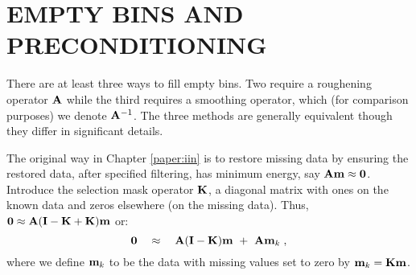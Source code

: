 %
%



\section{EMPTY BINS AND PRECONDITIONING}
There are at least three ways to fill empty bins.
Two require a roughening operator $\bold A$ while
the third requires a smoothing operator, which
(for comparison purposes) we denote $\bold A^{-1}$.
The three methods are generally equivalent
though they differ in significant details.

\par
The original way in
Chapter \ref{paper:iin} is to
restore missing data
by ensuring the restored data,
after specified filtering,
has minimum energy, say
$\bold A\bold m\approx \bold 0$.
Introduce the selection mask operator $\bold K$, 
a diagonal matrix with
ones on the known data and zeros elsewhere
(on the missing data).
Thus,
$ \bold 0 \approx \bold A(\bold I-\bold K+\bold K)\bold m $ or:
\begin{equation}
\bold 0 \quad\approx\quad
\bold A (\bold I-\bold K) \bold m
\ +\ 
\bold A \bold m_k\;,
\label{eqn:style0}
\end{equation}
where we define $\bold m_k$ to be the data
with missing values set to zero by 
$\bold m_k=\bold K\bold m$.

